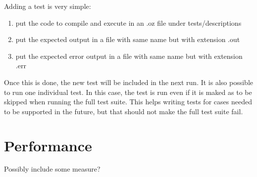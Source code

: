 \documentclass[a4paper]{memoir}
\begin{document}
Adding a test is very simple:
\begin{enumerate}
  \item put the code to compile and execute in an .oz file under tests/descriptions
  \item put the expected output in a file with same name but with extension .out
  \item put the expected error output in a file with same name but with extension .err
\end{enumerate}
Once this is done, the new test will be included in the next run.
It is also possible to run one individual test. In this case, the test is run even if it is maked as to be skipped when running the full test suite. This helps writing tests for cases needed to be supported in the future, but that should not make the full test suite fail.
\section{Performance}
Possibly include some measure?
\end{document}
